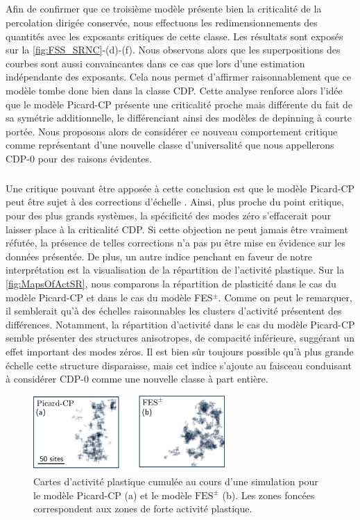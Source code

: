\subparagraph{}Afin de confirmer que ce troisième modèle présente bien la criticalité de la percolation dirigée conservée, nous effectuons les redimensionnements des quantités avec les exposants critiques de cette classe. Les résultats sont exposés sur la \autoref{fig:FSS_SRNC}-(d)-(f). Nous observons alors que les superpositions des courbes sont aussi convaincantes dans ce cas que lors d'une estimation indépendante des exposants. Cela nous permet d'affirmer raisonnablement que ce modèle tombe donc bien dans la classe CDP. Cette analyse renforce alors l'idée que le modèle Picard-CP présente une criticalité proche mais différente du fait de sa symétrie additionnelle, le différenciant ainsi des modèles de depinning à courte portée. Nous proposons alors de considérer ce nouveau comportement critique comme représentant d'une nouvelle classe d'universalité que nous appellerons CDP-0 pour des raisons évidentes.

\subparagraph{}Une critique pouvant être apposée à cette conclusion est que le modèle Picard-CP peut être sujet à des corrections d'échelle \cite{nishimori_elements_2015}. Ainsi, plus proche du point critique, pour des plus grands systèmes, la spécificité des modes zéro s'effacerait pour laisser place à la criticalité CDP. Si cette objection ne peut jamais être vraiment réfutée, la présence de telles corrections n'a pas pu être mise en évidence sur les données présentée. De plus, un autre indice penchant en faveur de notre interprétation est la visualisation de la répartition de l'activité plastique. Sur la \autoref{fig:MapsOfActSR}, nous comparons la répartition de plasticité dans le cas du modèle Picard-CP et dans le cas du modèle FES$^\pm$. Comme on peut le remarquer, il semblerait qu'à des échelles raisonnables les clusters d'activité présentent des différences. Notamment, la répartition d'activité dans le cas du modèle Picard-CP semble présenter des structures anisotropes, de compacité inférieure, suggérant un effet important des modes zéros. Il est bien sûr toujours possible qu'à plus grande échelle cette structure disparaisse, mais cet indice s'ajoute au faisceau conduisant à considérer CDP-0 comme une nouvelle classe à part entière.

\begin{figure}[h]
	\centering
	\includegraphics[width=0.65\textwidth]{Chapitre4/Figures/CourtePortee/MapsofActSR.pdf}
	\caption{Cartes d'activité plastique cumulée au cours d'une simulation pour le modèle Picard-CP (a) et le modèle $\text{FES}^\pm$ (b). Les zones foncées correspondent aux zones de forte activité plastique.}
	 \label{fig:MapsOfActSR}
\end{figure}

